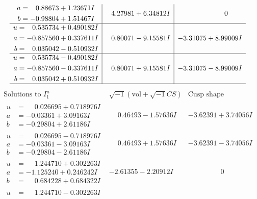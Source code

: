 \documentclass[1p]{elsarticle_modified}
\theoremstyle{definition}
\newcommand{\I}{\sqrt{-1}}
\begin{document}
$$\begin{array}{c|c|c}
\begin{aligned}
a &= \phantom{-}0.88673 + 1.23671 I \\
b &= -0.98804 + 1.51467 I\end{aligned}
 & \phantom{-}4.27981 + 6.34812 I & \phantom{-0.000000 } 0 \\ \hline\begin{aligned}
u &= \phantom{-}0.535734 + 0.490182 I \\
a &= -0.857560 + 0.337611 I \\
b &= \phantom{-}0.035042 - 0.510932 I\end{aligned}
 & \phantom{-}0.80071 - 9.15581 I & -3.31075 + 8.99009 I \\ \hline\begin{aligned}
u &= \phantom{-}0.535734 - 0.490182 I \\
a &= -0.857560 - 0.337611 I \\
b &= \phantom{-}0.035042 + 0.510932 I\end{aligned}
 & \phantom{-}0.80071 + 9.15581 I & -3.31075 - 8.99009 I\\
 \hline 
 \end{array}$$\newpage$$\begin{array}{c|c|c}  
\text{Solutions to }I^u_{1}& \I (\text{vol} + \sqrt{-1}CS) & \text{Cusp shape}\\
 \hline 
\begin{aligned}
u &= \phantom{-}0.026695 + 0.718976 I \\
a &= -0.03361 + 3.09163 I \\
b &= -0.29804 + 2.61186 I\end{aligned}
 & \phantom{-}0.46493 - 1.57636 I & -3.62391 + 3.74056 I \\ \hline\begin{aligned}
u &= \phantom{-}0.026695 - 0.718976 I \\
a &= -0.03361 - 3.09163 I \\
b &= -0.29804 - 2.61186 I\end{aligned}
 & \phantom{-}0.46493 + 1.57636 I & -3.62391 - 3.74056 I \\ \hline\begin{aligned}
u &= \phantom{-}1.244710 + 0.302263 I \\
a &= -1.125240 + 0.246242 I \\
b &= \phantom{-}0.684228 + 0.684322 I\end{aligned}
 & -2.61355 - 2.20912 I & \phantom{-0.000000 } 0 \\ \hline\begin{aligned}
u &= \phantom{-}1.244710 - 0.302263 I \\

\end{aligned}
\end{array}$$
\end{document}
